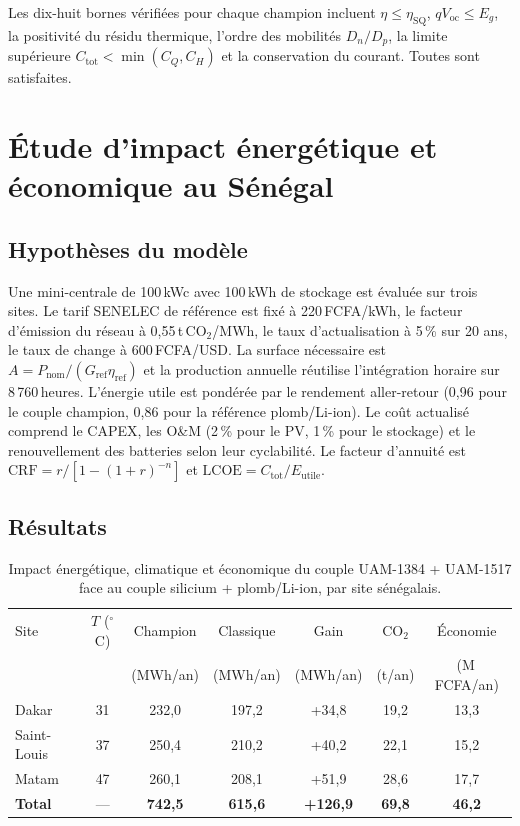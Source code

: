 \documentclass[11pt,a4paper,french]{article}
\begin{document}
Les dix-huit bornes vérifiées pour chaque champion incluent $\eta\leq\eta_{\mathrm{SQ}}$, $qV_{\mathrm{oc}}\leq E_g$, la positivité du résidu thermique, l'ordre des mobilités $D_n/D_p$, la limite supérieure $C_{\mathrm{tot}}<\min(C_Q,C_H)$ et la conservation du courant. Toutes sont satisfaites.

\section{Étude d'impact énergétique et économique au Sénégal}
\label{sec:impact}

\subsection{Hypothèses du modèle}

Une mini-centrale de 100\,kWc avec 100\,kWh de stockage est évaluée sur trois sites. Le tarif SENELEC de référence est fixé à 220\,FCFA/kWh, le facteur d'émission du réseau à 0,55\,t\,CO$_2$/MWh, le taux d'actualisation à 5\,\% sur 20 ans, le taux de change à 600\,FCFA/USD. La surface nécessaire est $A=P_{\mathrm{nom}}/(G_{\mathrm{ref}}\eta_{\mathrm{ref}})$ et la production annuelle réutilise l'intégration horaire sur 8\,760\,heures. L'énergie utile est pondérée par le rendement aller-retour (0,96 pour le couple champion, 0,86 pour la référence plomb/Li-ion). Le coût actualisé comprend le CAPEX, les O\&M (2\,\% pour le PV, 1\,\% pour le stockage) et le renouvellement des batteries selon leur cyclabilité. Le facteur d'annuité est $\mathrm{CRF}=r/[1-(1+r)^{-n}]$ et $\mathrm{LCOE}=C_{\mathrm{tot}}/E_{\mathrm{utile}}$.

\subsection{Résultats}

\begin{table}[htbp]
\centering\footnotesize
\begin{tabular}{@{}l c c c c c c@{}}
\toprule
Site & $T$ ($^\circ$C) & Champion & Classique & Gain & CO$_2$ & Économie \\
     &                 & (MWh/an) & (MWh/an) & (MWh/an) & (t/an) & (M\,FCFA/an) \\
\midrule
Dakar        & 31 & 232,0 & 197,2 & +34,8  & 19,2 & 13,3 \\
Saint-Louis  & 37 & 250,4 & 210,2 & +40,2  & 22,1 & 15,2 \\
Matam        & 47 & 260,1 & 208,1 & +51,9  & 28,6 & 17,7 \\
\midrule
\textbf{Total} & — & \textbf{742,5} & \textbf{615,6} & \textbf{+126,9} & \textbf{69,8} & \textbf{46,2} \\
\bottomrule
\end{tabular}
\caption{Impact énergétique, climatique et économique du couple UAM-1384 + UAM-1517 face au couple silicium + plomb/Li-ion, par site sénégalais.}
\label{tab:impact}
\end{table}
\end{document}
